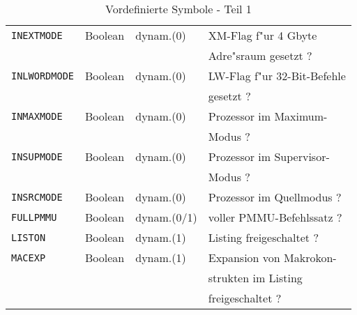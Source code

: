 \documentclass[12pt,a4paper,twoside]{report}
\newcommand{\tty}[1]{{\tt #1}}
\begin{document}
{\begin{table*}[ht]
\begin{center}
\begin{tabular}{|l|l|l|l|}
\hline
\tty{INEXTMODE}  &  Boolean    & dynam.(0)  & XM-Flag f"ur 4 Gbyte \\
                 &             &            & Adre"sraum gesetzt ? \\
\hline
\tty{INLWORDMODE} & Boolean    & dynam.(0)  & LW-Flag f"ur 32-Bit-Befehle \\
                 &             &            & gesetzt ? \\
\hline
\tty{INMAXMODE}  &  Boolean    & dynam.(0)  & Prozessor im Maximum- \\
                 &             &            & Modus ? \\
\hline
\tty{INSUPMODE}  &  Boolean    & dynam.(0)  & Prozessor im Supervisor- \\
                 &             &            & Modus ? \\
\hline
\tty{INSRCMODE}  &  Boolean    & dynam.(0)  & Prozessor im Quellmodus ? \\
\hline
\tty{FULLPMMU}   &  Boolean    & dynam.(0/1) & voller PMMU-Befehlssatz ? \\
\hline
\tty{LISTON}     &  Boolean    & dynam.(1)  & Listing freigeschaltet ? \\
\hline
\tty{MACEXP}     &  Boolean    & dynam.(1)  & Expansion von Makrokon- \\
                 &             &            & strukten im Listing \\
                 &             &            & freigeschaltet ? \\
\hline
\end{tabular}\end{center}
\caption{Vordefinierte Symbole - Teil 1\label{TabInternSyms1}}
\end{table*}

}
\end{document}
